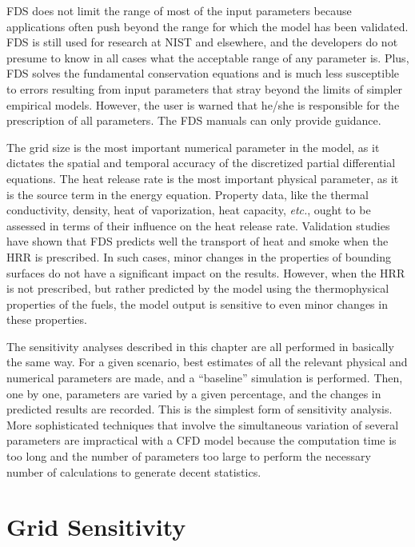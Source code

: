 \documentclass[11pt]{book}
\begin{document}
FDS does not  limit the range of most of  the input parameters because
applications often push beyond the  range for which the model has been
validated.  FDS is still used  for research at NIST and elsewhere, and
the developers do not presume to know in all cases what the acceptable
range  of   any  parameter  is.  Plus,  FDS   solves  the  fundamental
conservation  equations  and  is   much  less  susceptible  to  errors
resulting  from  input parameters  that  stray  beyond  the limits  of
simpler empirical models.  However, the user is warned  that he/she is
responsible for  the prescription of all parameters.   The FDS manuals
can only provide guidance.

The grid size is the  most important numerical parameter in the model,
as it  dictates the spatial  and temporal accuracy of  the discretized
partial  differential equations.  The heat  release rate  is  the most
important physical parameter,  as it is the source  term in the energy
equation. Property data, like  the thermal conductivity, density, heat
of vaporization,  heat capacity, {\em  etc.}, ought to be  assessed in
terms of their influence on  the heat release rate. Validation studies
have shown that FDS predicts well the transport of heat and smoke when
the HRR is prescribed. In  such cases, minor changes in the properties
of  bounding  surfaces  do  not  have  a  significant  impact  on  the
results. However, when the HRR is not prescribed, but rather predicted
by the  model using  the thermophysical properties  of the  fuels, the
model output is sensitive to even minor changes in these properties.

The sensitivity  analyses described in this chapter  are all performed
in basically the same way. For a given scenario, best estimates of all
the  relevant  physical  and  numerical  parameters are  made,  and  a
``baseline'' simulation is performed. Then, one by one, parameters are
varied by a given percentage, and the changes in predicted results are
recorded.  This is  the simplest  form of  sensitivity  analysis. More
sophisticated  techniques that involve  the simultaneous  variation of
several  parameters  are impractical  with  a  CFD  model because  the
computation time is too long and the number of parameters too large to
perform  the  necessary  number  of calculations  to  generate  decent
statistics.



\section{Grid Sensitivity}
\end{document}
